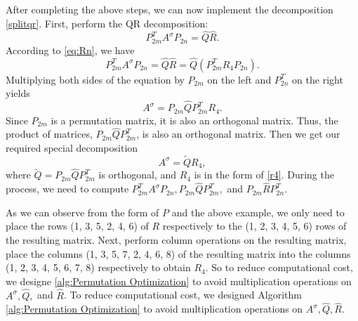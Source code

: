 \documentclass[12pt]{article}
\numberwithin{equation}{section}
\begin{document}
After completing the above steps, we can now  implement the decomposition \eqref{splitqr}.
First, perform the QR decomposition:
\[P_{2m}^TA^\sigma P_{2n} = \widehat{Q}\widehat{R}.\]
According to \eqref{eq:Rn}, we have
\[P_{2m}^TA^\sigma P_{2n} = \widehat{Q}\widehat{R} = \widehat{Q}(P_{2m}^TR_4P_{2n}).\]
Multiplying both sides of the equation by $P_{2m}$ on the left and $P_{2n}^T$ on the right yields
\[A^\sigma=P_{2m}\widehat{Q}P_{2m}^T R_4.\]
 Since $P_{2m}$ is a permutation matrix, it is also an orthogonal matrix. Thus, the product of matrices, $P_{2m}\widehat{Q}P_{2m}^T$, is also an orthogonal matrix. Then we get our required special decomposition \[A^\sigma=\widetilde{Q}R_4,\] where $\widetilde{Q}=P_{2m}\widehat{Q}P_{2m}^T$ is orthogonal, and $R_4$ is in the form of \eqref{r4}. During the process, we need to compute 
$P_{2m}^TA^\sigma P_{2n}, P_{2m}\widehat{Q}P_{2m}^T,$ and $ P_{2m} \widehat{R}P_{2n}^T$. 

As we can observe from the form of $P$ and the above example, we only need to place the rows (1, 3, 5, 2, 4, 6) of $R$ respectively to the (1, 2, 3, 4, 5, 6) rows of the resulting matrix. Next, perform column operations on the resulting matrix, place the columns (1, 3, 5, 7, 2, 4, 6, 8) of the resulting matrix into the columns (1, 2, 3, 4, 5, 6, 7, 8) respectively to obtain $R_4$.
 So to reduce computational cost, we designe \cref{alg:Permutation Optimization} to avoid multiplication operations on $A^\sigma, \widehat{Q}, $ and $ \widehat{R}$.
\iffalse
To reduce computational cost, we designed Algorithm \cref{alg:Permutation Optimization} to avoid multiplication operations on $A^\sigma, \widehat{Q}, \widehat{R}$.
\end{document}
